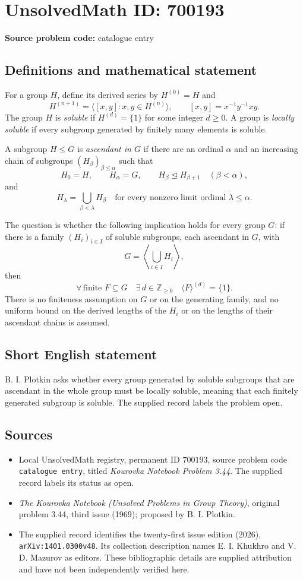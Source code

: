 \documentclass[11pt]{article}
\begin{document}
\section*{UnsolvedMath ID: 700193}
\textbf{Source problem code:} catalogue entry
\subsection{Definitions and mathematical statement}
For a group \(H\), define its derived series by \(H^{(0)}=H\) and
\[
H^{(n+1)}=\bigl\langle [x,y]:x,y\in H^{(n)}\bigr\rangle,
\qquad [x,y]=x^{-1}y^{-1}xy.
\]
The group \(H\) is \emph{soluble} if \(H^{(d)}=\{1\}\) for some integer \(d\geq 0\). A group is \emph{locally soluble} if every subgroup generated by finitely many elements is soluble.

A subgroup \(H\leq G\) is \emph{ascendant in \(G\)} if there are an ordinal \(\alpha\) and an increasing chain of subgroups \((H_\beta)_{\beta\leq\alpha}\) such that
\[
H_0=H,\qquad H_\alpha=G,\qquad
H_\beta\trianglelefteq H_{\beta+1}\quad(\beta<\alpha),
\]
and
\[
H_\lambda=\bigcup_{\beta<\lambda}H_\beta
\quad\text{for every nonzero limit ordinal }\lambda\leq\alpha.
\]

The question is whether the following implication holds for every group \(G\): if there is a family \((H_i)_{i\in I}\) of soluble subgroups, each ascendant in \(G\), with
\[
G=\left\langle\bigcup_{i\in I}H_i\right\rangle,
\]
then
\[
\forall\,\text{finite }F\subseteq G\quad
\exists\,d\in\mathbb Z_{\geq0}\quad
\langle F\rangle^{(d)}=\{1\}.
\]
There is no finiteness assumption on \(G\) or on the generating family, and no uniform bound on the derived lengths of the \(H_i\) or on the lengths of their ascendant chains is assumed.
\subsection{Short English statement}
B. I. Plotkin asks whether every group generated by soluble subgroups that are ascendant in the whole group must be locally soluble, meaning that each finitely generated subgroup is soluble. The supplied record labels the problem open.
\subsection{Sources}
\begin{itemize}
\item Local UnsolvedMath registry, permanent ID \(700193\), source problem code \texttt{catalogue entry}, titled \emph{Kourovka Notebook Problem 3.44}. The supplied record labels its status as open.
\item \emph{The Kourovka Notebook (Unsolved Problems in Group Theory)}, original problem 3.44, third issue (1969); proposed by B. I. Plotkin.
\item The supplied record identifies the twenty-first issue edition (2026), \texttt{arXiv:1401.0300v48}. Its collection description names E. I. Khukhro and V. D. Mazurov as editors. These bibliographic details are supplied attribution and have not been independently verified here.
\end{itemize}
\end{document}

